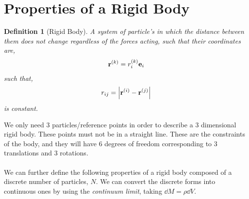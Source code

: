 \documentclass{book}
\newtheorem*{definition}{Definition}
\begin{document}
\section{Properties of a Rigid Body}
\begin{definition}[Rigid Body]
    A system of particle's in which the distance between them does not change regardless of the forces acting, such that their coordinates are,
    \begin{equation}
        \vb{r}^{(k)} = r_i^{(k)}\vb{e}_i
    \end{equation}
    such that,
    \begin{equation}
        r_{ij} = \left|\vb{r}^{(i)} - \vb{r}^{(j)}\right|
    \end{equation}
    is constant.
\end{definition}
\noindent
We only need 3 particles/reference points in order to describe a 3 dimensional rigid body. These points must not be in a straight line. These are the constraints of the body, and they will have 6 degrees of freedom corresponding to 3 translations and 3 rotations.\\\\
We can further define the following properties of a rigid body composed of a discrete number of particles, $N$. We can convert the discrete forms into continuous ones by using the \textit{continuum limit}, taking $\dd{M} = \rho \dd{V}$.
\end{document}
